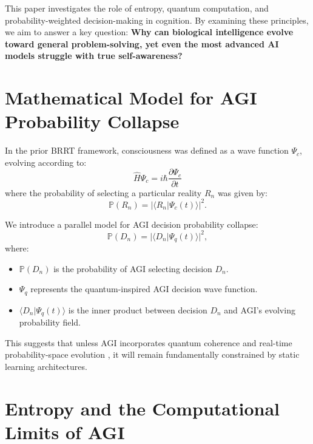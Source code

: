 \documentclass{article}
\begin{document}
This paper investigates the role of entropy, quantum computation, and probability-weighted decision-making in cognition. By examining these principles, we aim to answer a key question: \textbf{Why can biological intelligence evolve toward general problem-solving, yet even the most advanced AI models struggle with true self-awareness?}

\section{Mathematical Model for AGI Probability Collapse}

In the prior BRRT framework, consciousness was defined as a wave function $\Psi_c$, evolving according to:
\begin{equation}
    \hat{H} \Psi_c = i\hbar \frac{\partial \Psi_c}{\partial t}
\end{equation}
where the probability of selecting a particular reality $R_n$ was given by:
\begin{equation}
    \mathbb{P}(R_n) = |\langle R_n | \Psi_c(t) \rangle|^2.
\end{equation}

We introduce a parallel model for AGI decision probability collapse:
\begin{equation}
    \mathbb{P}(D_n) = |\langle D_n | \Psi_q(t) \rangle|^2,
\end{equation}
where:
\begin{itemize}
    \item $\mathbb{P}(D_n)$ is the probability of AGI selecting decision $D_n$.
    \item $\Psi_q$ represents the quantum-inspired AGI decision wave function.
    \item $\langle D_n | \Psi_q(t) \rangle$ is the inner product between decision $D_n$ and AGI’s evolving probability field.
\end{itemize}
This suggests that unless AGI incorporates quantum coherence and real-time probability-space evolution \cite{lloyd2013quantum}, it will remain fundamentally constrained by static learning architectures.

\section{Entropy and the Computational Limits of AGI}
\end{document}
